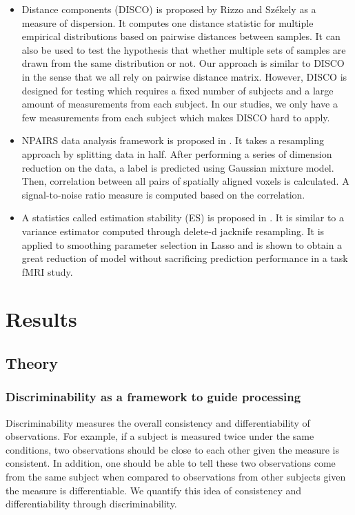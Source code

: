 \documentclass{article}
\begin{document}
\begin{itemize}
	\item Distance components (DISCO) is proposed by Rizzo and Sz{\'e}kely as a measure of dispersion\cite{rizzo2010disco}. It computes one distance statistic for multiple empirical distributions based on pairwise distances between samples. It can also be used to test the hypothesis that whether multiple sets of samples are drawn from the same distribution or not. Our approach is similar to DISCO in the sense that we all rely on pairwise distance matrix. However, DISCO is designed for testing which requires a fixed number of subjects and a large amount of measurements from each subject. In our studies, we only have a few measurements from each subject which makes DISCO hard to apply.  
	\item NPAIRS data analysis framework is proposed in \cite{strother2002quantitative}. It takes a resampling approach by splitting data in half. After performing a series of dimension reduction on the data, a label is predicted using Gaussian mixture model. Then, correlation between 
	all pairs of spatially aligned voxels is calculated. A signal-to-noise ratio measure is computed based on the correlation.
	\item A statistics called estimation stability (ES) is proposed in \cite{yu2013stability}. It is similar to a variance estimator computed through delete-d jacknife resampling. It is applied to smoothing parameter selection in Lasso and is shown to obtain a great reduction of model without sacrificing prediction performance in a task fMRI study.
\end{itemize}


\section{Results}
\subsection{Theory}

\subsubsection{Discriminability as a framework to guide processing}
Discriminability measures the overall consistency and differentiability of observations. For example, if a subject is measured twice under the same conditions, two observations should be close to each other given the measure is consistent. In addition, one should be able to tell these two observations come from the same subject when compared to observations from other subjects given the measure is differentiable. We quantify this idea of consistency and differentiability through discriminability.
\end{document}
